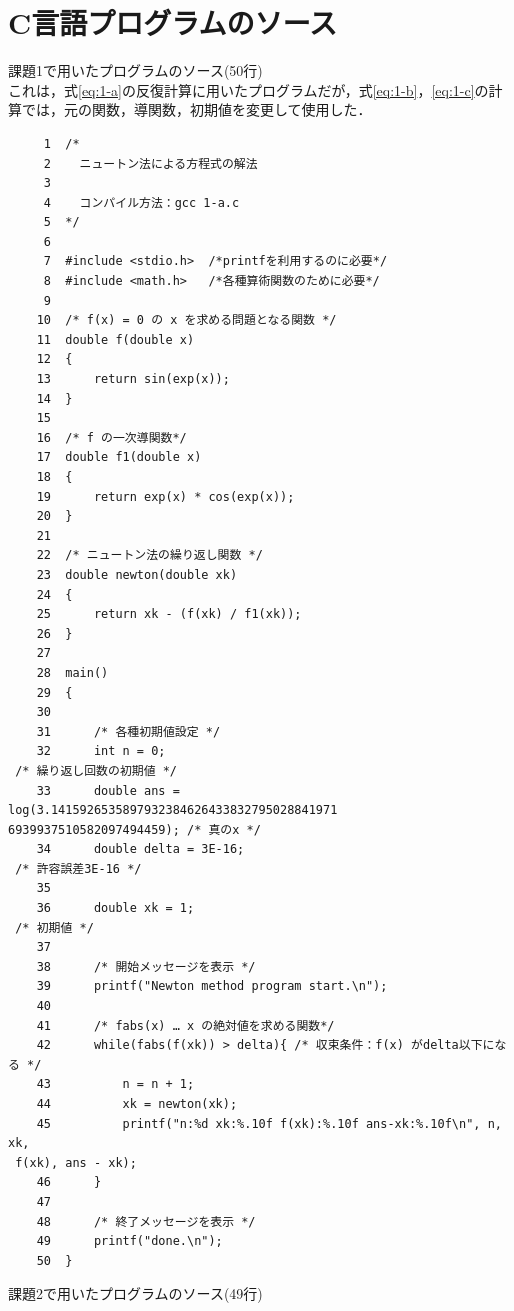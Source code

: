\documentclass[12pt]{jarticle}
\renewcommand  \[  {\begin{eqnarray}}
\renewcommand  \]  {\end{eqnarray}}
\begin{document}
\section{C言語プログラムのソース}
課題1で用いたプログラムのソース(50行) \\
これは，式\ref{eq:1-a}の反復計算に用いたプログラムだが，式\ref{eq:1-b}，\ref{eq:1-c}の計算では，元の関数，導関数，初期値を変更して使用した．
\begin{verbatim}
     1	/*
     2	  ニュートン法による方程式の解法
     3	
     4	  コンパイル方法：gcc 1-a.c
     5	*/
     6	
     7	#include <stdio.h>  /*printfを利用するのに必要*/
     8	#include <math.h>   /*各種算術関数のために必要*/
     9	
    10	/* f(x) = 0 の x を求める問題となる関数 */
    11	double f(double x)
    12	{
    13	    return sin(exp(x));
    14	}
    15	
    16	/* f の一次導関数*/
    17	double f1(double x)
    18	{
    19	    return exp(x) * cos(exp(x));
    20	}
    21	
    22	/* ニュートン法の繰り返し関数 */
    23	double newton(double xk)
    24	{
    25	    return xk - (f(xk) / f1(xk));
    26	}
    27	
    28	main()
    29	{
    30	
    31	    /* 各種初期値設定 */
    32	    int n = 0;                                                                         
 /* 繰り返し回数の初期値 */
    33	    double ans = log(3.1415926535897932384626433832795028841971
6939937510582097494459); /* 真のx */
    34	    double delta = 3E-16;                                                              
 /* 許容誤差3E-16 */
    35	
    36	    double xk = 1;                                                                     
 /* 初期値 */
    37	
    38	    /* 開始メッセージを表示 */
    39	    printf("Newton method program start.\n");
    40	
    41	    /* fabs(x) … x の絶対値を求める関数*/
    42	    while(fabs(f(xk)) > delta){ /* 収束条件：f(x) がdelta以下になる */
    43	        n = n + 1;
    44	        xk = newton(xk);
    45	        printf("n:%d xk:%.10f f(xk):%.10f ans-xk:%.10f\n", n, xk,
 f(xk), ans - xk);
    46	    }
    47	
    48	    /* 終了メッセージを表示 */
    49	    printf("done.\n");
    50	}
\end{verbatim}
課題2で用いたプログラムのソース(49行)
\end{document}

